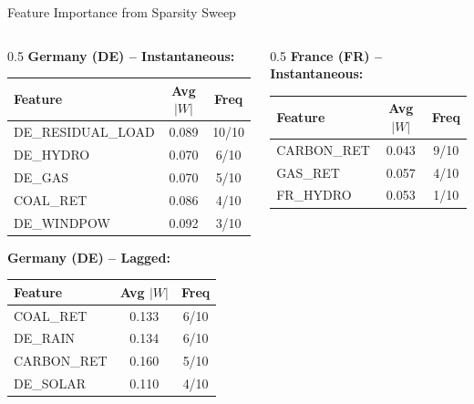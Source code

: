 \documentclass[aspectratio=169]{beamer}
\begin{document}
\begin{frame}{Feature Importance from Sparsity Sweep}
\begin{columns}
\begin{column}{0.5\textwidth}
\textbf{Germany (DE) -- Instantaneous:}
\begin{table}
\scriptsize
\begin{tabular}{l|c|c}
\toprule
\textbf{Feature} & \textbf{Avg $|W|$} & \textbf{Freq} \\
\midrule
\textcolor{reprogreen}{DE\_RESIDUAL\_LOAD} & 0.089 & 10/10 \\
DE\_HYDRO & 0.070 & 6/10 \\
DE\_GAS & 0.070 & 5/10 \\
COAL\_RET & 0.086 & 4/10 \\
DE\_WINDPOW & 0.092 & 3/10 \\
\bottomrule
\end{tabular}
\end{table}

\textbf{Germany (DE) -- Lagged:}
\begin{table}
\scriptsize
\begin{tabular}{l|c|c}
\toprule
\textbf{Feature} & \textbf{Avg $|W|$} & \textbf{Freq} \\
\midrule
\textcolor{reprogreen}{COAL\_RET} & 0.133 & 6/10 \\
\textcolor{reprogreen}{DE\_RAIN} & 0.134 & 6/10 \\
CARBON\_RET & 0.160 & 5/10 \\
DE\_SOLAR & 0.110 & 4/10 \\
\bottomrule
\end{tabular}
\end{table}
\end{column}

\begin{column}{0.5\textwidth}
\textbf{France (FR) -- Instantaneous:}
\begin{table}
\scriptsize
\begin{tabular}{l|c|c}
\toprule
\textbf{Feature} & \textbf{Avg $|W|$} & \textbf{Freq} \\
\midrule
\textcolor{reprogreen}{CARBON\_RET} & 0.043 & 9/10 \\
GAS\_RET & 0.057 & 4/10 \\
FR\_HYDRO & 0.053 & 1/10 \\
\bottomrule
\end{tabular}
\end{table}


\end{column}
\end{columns}
\end{frame}
\end{document}
